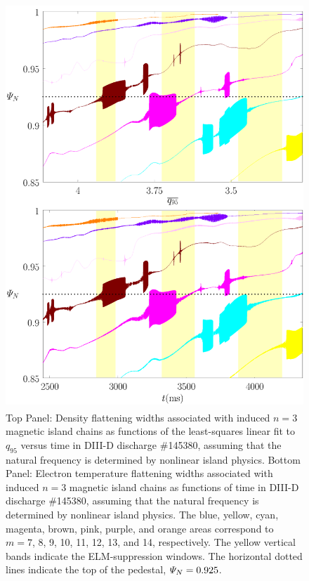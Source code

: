 \documentclass[12pt,prb,aps]{revtex4-1}
\begin{document}
\begin{figure}
\includegraphics[height=6in]{fig7.pdf}
\caption{Top Panel: Density flattening widths associated with induced $n=3$ magnetic island  chains as functions of the least-squares linear fit to $q_{95}$ versus time
in   DIII-D discharge \#145380, assuming that the natural frequency is determined by nonlinear island physics.
Bottom Panel:  Electron temperature flattening widths associated with induced $n=3$ magnetic island chains as functions of time
in   DIII-D discharge \#145380, assuming that the natural frequency is determined by nonlinear island physics. The blue, yellow, cyan, magenta, brown, pink,
purple, and orange  areas correspond to $m=7$, 8, 9, 10, 11, 12, 13, and 14, respectively. The yellow vertical bands indicate the ELM-suppression windows. 
The horizontal dotted lines indicate the top of the pedestal, ${\mit\Psi}_N=0.925$.} \label{fig7}
\end{figure}
\end{document}
